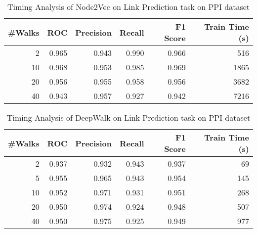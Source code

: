 \documentclass[sigconf]{acmart}
\begin{document}
\begin{table}[H]
\begin{tabular}{|r|r|r|r|r|r|}
\hline
\textbf{\#Walks} & \textbf{ROC} & \textbf{Precision} & \textbf{Recall} & \textbf{F1 Score} & \textbf{Train Time (s)}\\
\hline
2&	0.965&	0.943&	0.990&	0.966&	516\\
10&	0.968&	0.953&	0.985&	0.969&	1865\\
20&	0.956&	0.955&	0.958&	0.956&	3682\\
40&	0.943&	0.957&	0.927&	0.942&	7216\\
\hline
\end{tabular}
\caption{Timing Analysis of Node2Vec on Link Prediction task on PPI dataset}
\label{tab:timing_n2v}
\end{table}

\begin{table}[H]
\begin{tabular}{|r|r|r|r|r|r|}
\hline
\textbf{\#Walks} & \textbf{ROC} & \textbf{Precision} & \textbf{Recall} & \textbf{F1 Score} & \textbf{Train Time (s)}\\
\hline
2&0.937&	0.932&	0.943&	0.937&	69\\
5&0.955&	0.965&	0.943&	0.954&	145\\
10&0.952&	0.971&	0.931&	0.951&	268\\
20&0.950&	0.974&	0.924&	0.948&	507\\
40&0.950&	0.975&	0.925&	0.949&	977\\
\hline
\end{tabular}
\caption{Timing Analysis of DeepWalk on Link Prediction task on PPI dataset}

\label{tab:timing_dw}
\end{table}
\end{document}
